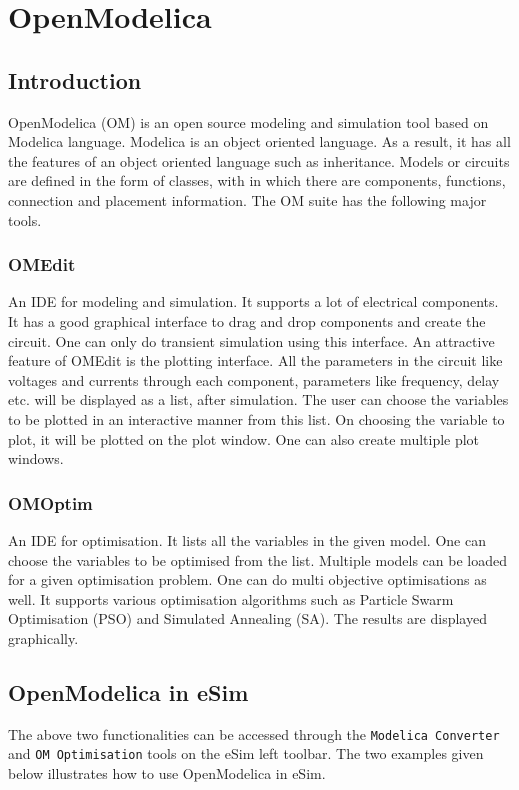 \chapter{OpenModelica}
\thispagestyle{empty}
\label{chap10}

\section {Introduction}
OpenModelica (OM) is an open source modeling and simulation tool based on
Modelica language. Modelica is an object oriented language. As a result, it has all the
features of an object oriented language such as inheritance. Models or circuits are
defined in the form of classes, with in which there are components, functions,
connection and placement information. The OM suite has the following major tools.

\subsection {OMEdit}
An IDE for modeling and simulation. It supports a lot of electrical components. It
has a good graphical interface to drag and drop components and create the circuit.
One can only do transient simulation using this interface. An attractive feature of
OMEdit is the plotting interface. All the parameters in the circuit like voltages and currents through each component,
parameters like frequency, delay etc. will be displayed as
a list, after simulation. The user can choose the variables to be plotted in an
interactive manner from this list. On choosing the variable to plot, it will be plotted
on the plot window. One can also create multiple plot windows.

\subsection {OMOptim}
An IDE for optimisation. It lists all the variables in the given model. One can choose
the variables to be optimised from the list. Multiple models can be loaded for a given
optimisation problem. One can do multi objective optimisations as well. It supports
various optimisation algorithms such as Particle Swarm Optimisation (PSO) and
Simulated Annealing (SA). The results are displayed graphically.

\section {OpenModelica in eSim}
The above two functionalities can be accessed through the {\tt Modelica Converter} and {\tt OM Optimisation} tools on the eSim left toolbar. The two examples given below illustrates how to use OpenModelica in eSim. 

